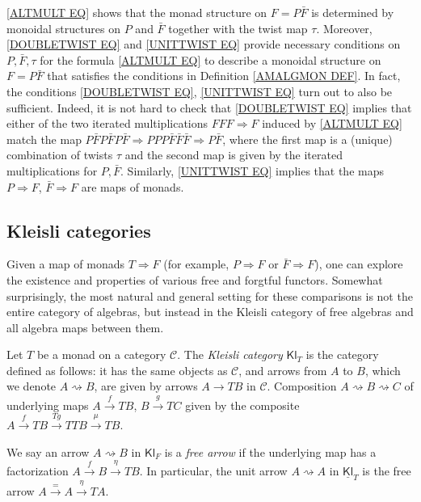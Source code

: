 \documentclass[a4paper,10pt
]{article}%
\renewcommand{\1}{\eta}%
\newcommand{\Kl}{\underline{\mathsf{Kl}}}
\begin{document}
\begin{remark}\label{ALTMULT REM}
	\eqref{ALTMULT EQ} shows that the monad structure on $F=P\bar{F}$ is determined by monoidal structures on $P$ and $\bar{F}$ together with  the twist map $\tau$.
	Moreover, \eqref{DOUBLETWIST EQ} and \eqref{UNITTWIST EQ} provide necessary conditions on $P,\bar{F},\tau$
	for the formula \eqref{ALTMULT EQ}
	to describe a monoidal structure on $F=P\bar{F}$
	that satisfies the conditions in 
	Definition \ref{AMALGMON DEF}.
	In fact, the conditions \eqref{DOUBLETWIST EQ}, \eqref{UNITTWIST EQ}
	turn out to also be sufficient.
	Indeed, it is not hard to check 
	that \eqref{DOUBLETWIST EQ} implies that either of the two iterated multiplications
	$FFF \Rightarrow F$ induced by \eqref{ALTMULT EQ}
	match the map 
	$P\bar{F} P\bar{F} P \bar{F} \Rightarrow 
	PPP \bar{F} \bar{F} \bar{F} \Rightarrow P \bar{F}$,
	where the first map is a (unique) combination of twists $\tau$
	and the second map is given by the iterated multiplications for $P,\bar{F}$.
	Similarly, \eqref{UNITTWIST EQ} implies that the maps
	$P \Rightarrow F$, $\bar{F} \Rightarrow F$
	are maps of monads.
\end{remark}



\subsection{Kleisli categories}

Given a map of monads $T \Rightarrow F$ (for example, $P \Rightarrow F$ or $\bar F \Rightarrow F$), one can explore the existence and properties of various free and forgtful functors.
Somewhat surprisingly, the most natural and general setting for these comparisons is not the entire category of algebras,
but instead in the Kleisli category of free algebras and all algebra maps between them.

\begin{definition}[{\cite{Kl65}}]
	Let $T$ be a monad on a category $\mathcal C$.
	The \textit{Kleisli category} $\mathsf{Kl}_T$ is the category defined as follows:
	it has the same objects as $\mathcal{C}$,
	and arrows from $A$ to $B$,
	which we denote $A \rightsquigarrow B$,
	are given by arrows $A \to TB$ in $\mathcal{C}$.
	Composition
	$A \rightsquigarrow B \rightsquigarrow C$
	of underlying maps 
	$A \xrightarrow{f} TB$,
	$B \xrightarrow{g} TC$
	given by the composite
	$A \xrightarrow{f} TB \xrightarrow{Tg} TTB \xrightarrow{\mu} TB$.
	
	We say an arrow
	$A \rightsquigarrow B$ in $\mathsf{Kl}_F$ is a 
	\emph{free arrow}
	if the underlying map has a factorization
	$A \xrightarrow{f} B \xrightarrow{\eta} TB$.
	In particular, the unit arrow $A \rightsquigarrow A$ in $\Kl_T$
	is the free arrow $A \xrightarrow{=} A \xrightarrow{\eta} TA$.
\end{definition}
\end{document}
